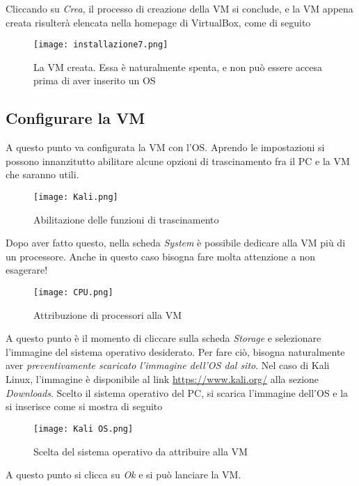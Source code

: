 \documentclass[14pt]{extreport}
\begin{document}
Cliccando su \textit{Crea}, il processo di creazione della VM si conclude, e la VM appena creata risulterà elencata nella homepage di VirtualBox, come di seguito 

\begin{figure}[H]
    \centering
    \texttt{[image: installazione7.png]}
    \caption{La VM creata. Essa è naturalmente spenta, e non può essere accesa prima di aver inserito un OS}
    \label{vbinsta7}
\end{figure}

\subsection{Configurare la VM}\label{Config}
A questo punto va configurata la VM con l'OS. Aprendo le impostazioni si possono innanzitutto abilitare alcune opzioni di trascinamento fra il PC e la VM che saranno utili.

\begin{figure}[H]
    \centering
    \texttt{[image: Kali.png]}
    \caption{Abilitazione delle funzioni di trascinamento}
    \label{Trasc}
\end{figure}

Dopo aver fatto questo, nella scheda \textit{System} è possibile dedicare alla VM più di un processore. Anche in questo caso bisogna fare molta attenzione a non esagerare!


\begin{figure}[H]
    \centering
    \texttt{[image: CPU.png]}
    \caption{Attribuzione di processori alla VM}
    \label{cpuVM}
\end{figure}

A questo punto è il momento di cliccare sulla scheda \textit{Storage} e selezionare l'immagine del sistema operativo desiderato. Per fare ciò, bisogna naturalmente aver \textit{preventivamente scaricato l'immagine dell'OS dal sito}. Nel caso di Kali Linux, l'immagine è disponibile al link \url{https://www.kali.org/} alla sezione \textit{Downloads}. Scelto il sistema operativo del PC, si scarica l'immagine dell'OS e la si inserisce come si mostra di seguito

\begin{figure}[H]
    \centering
    \texttt{[image: Kali OS.png]}
    \caption{Scelta del sistema operativo da attribuire alla VM}
    \label{KaliOS}
\end{figure}

A questo punto si clicca su \textit{Ok} e si può lanciare la VM.
\end{document}
